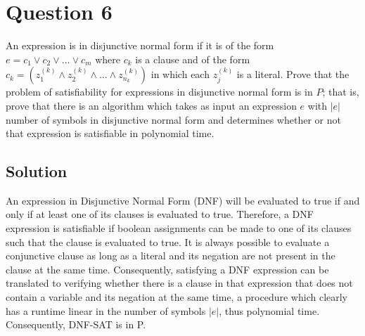 
\section*{Question 6}

An expression is in disjunctive normal form if it is of the form $e = c_1 \vee c_2 \vee \dots \vee c_m$ where $c_k$ is a clause and of the form $c_k = (z_1^{(k)} \wedge z_2^{(k)} \wedge \dots \wedge z_{n_k}^{(k)})$ in which each $z_j^{(k)}$ is a literal.
Prove that the problem of satisfiability for expressions in disjunctive normal form is in $P$; that is, prove that there is an algorithm which takes as input an expression $e$ with $|e|$ number of symbols in disjunctive normal form and determines whether or not that expression is satisfiable in polynomial time.

\subsection*{Solution}

An expression in Disjunctive Normal Form (DNF) will be evaluated to true if and only if at least one of its clauses is evaluated to true.
Therefore, a DNF expression is satisfiable if boolean assignments can be made to one of its clauses such that the clause is evaluated to true.
It is always possible to evaluate a conjunctive clause as long as a literal and its negation are not present in the clause at the same time.
Consequently, satisfying a DNF expression can be translated to verifying whether there is a clause in that expression that does not contain a variable and its negation at the same time, a procedure which clearly has a runtime linear in the number of symbols $|e|$, thus polynomial time.
Consequently, DNF-SAT is in P.

